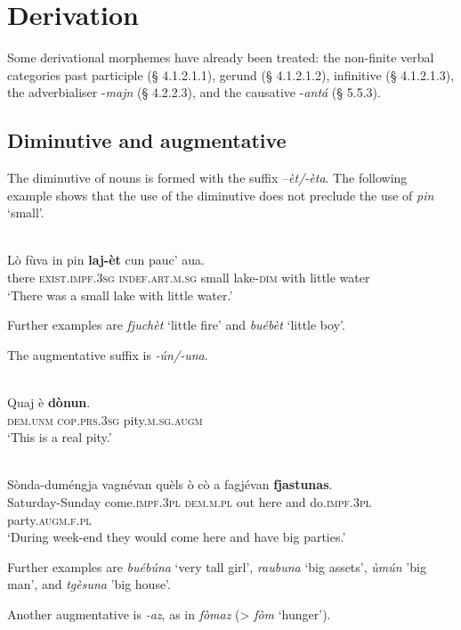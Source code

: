 \section{Derivation}
Some derivational morphemes have already been treated: the non-finite verbal categories past participle (§ 4.1.2.1.1), gerund (§ 4.1.2.1.2), infinitive (§ 4.1.2.1.3), the adverbialiser -\textit{majn} (§ 4.2.2.3), and the causative -\textit{antá} (§ 5.5.3).


\subsection{Diminutive and augmentative}
The diminutive of nouns is formed with the suffix –\textit{èt/-èta}. The following example shows that the use of the diminutive does not preclude the use of \textit{pin} `small'.

\ea\label{}
\\
\gll    Lò fùva in pin \textbf{laj-èt} cun pauc’ aua.\\
     there \textsc{exist.impf.3sg} \textsc{indef.art.m.sg} small lake-\textsc{dim} with little water \\
\glt `There was a small lake with little water.'
\z

Further examples are \textit{fjuchèt} `little fire' and \textit{buébèt} `little boy'.

The augmentative suffix is \textit{-ún/-una}.

\ea
\label{}
\\
\gll  Quaj è \textbf{dònun}. \\
\textsc{dem.unm} \textsc{cop.prs.3sg} pity.\textsc{m.sg.augm}\\
\glt `This is a real pity.'
\z

\ea
\label{}
\\
\gll Sònda-duméngja vagnévan quèls ò cò a fagjévan \textbf{fjastunas}.\\
Saturday-Sunday come.\textsc{impf.3pl} \textsc{dem.m.pl} out here and do.\textsc{impf.3pl} party.\textsc{augm.f.pl}\\
\glt `During week-end they would come here and have big parties.'
\z

Further examples are \textit{buébúna} `very tall girl', \textit{raubuna} `big assets', \textit{ùmún} 'big man', and \textit{tgèsuna} 'big house'.

Another augmentative is \textit{-az}, as in \textit{fòmaz} (> \textit{fòm} `hunger').

